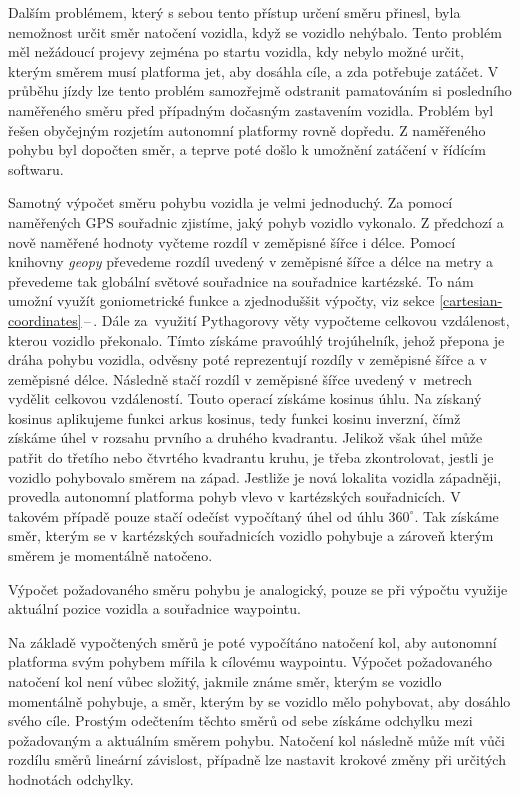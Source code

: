 \documentclass[czech, bachelor]{diploma}
\newcommand{\filipref}[1]{\ref{#1}\,--\,\nameref{#1}}
\begin{document}
Dalším problémem, který s sebou tento přístup určení směru přinesl, byla nemožnost určit směr natočení vozidla, když se vozidlo
nehýbalo. Tento problém měl nežádoucí projevy zejména po startu vozidla, kdy nebylo možné určit, kterým směrem musí platforma jet,
aby dosáhla cíle, a zda potřebuje zatáčet. V průběhu jízdy lze tento problém samozřejmě odstranit pamatováním si posledního
naměřeného směru před případným dočasným zastavením vozidla. Problém byl řešen obyčejným rozjetím autonomní platformy rovně
dopředu. Z naměřeného pohybu byl dopočten směr, a teprve poté došlo k umožnění zatáčení v řídícím softwaru.


Samotný výpočet směru pohybu vozidla je velmi jednoduchý. Za pomocí naměřených GPS souřadnic zjistíme, jaký pohyb vozidlo
vykonalo. Z předchozí a nově naměřené hodnoty vyčteme rozdíl v zeměpisné šířce i délce. Pomocí knihovny \emph{geopy} převedeme
rozdíl uvedený v zeměpisné šířce a délce na metry a převedeme tak globální světové souřadnice na souřadnice kartézské. To nám
umožní využít goniometrické funkce a zjednoduššit výpočty, viz sekce \filipref{cartesian-coordinates}. Dále za~využití Pythagorovy
věty vypočteme celkovou vzdálenost, kterou vozidlo překonalo. Tímto získáme pravoúhlý trojúhelník, jehož přepona je dráha
pohybu vozidla, odvěsny poté reprezentují rozdíly v zeměpisné šířce a v zeměpisné délce. Následně stačí rozdíl v zeměpisné šířce
uvedený v~metrech vydělit celkovou vzdáleností. Touto operací získáme kosinus úhlu. Na získaný kosinus aplikujeme funkci arkus
kosinus, tedy funkci kosinu inverzní, čímž získáme úhel v rozsahu prvního a druhého kvadrantu. Jelikož však úhel může patřit do
třetího nebo čtvrtého kvadrantu kruhu, je třeba zkontrolovat, jestli je vozidlo pohybovalo směrem na západ. Jestliže je nová
lokalita vozidla západněji, provedla autonomní platforma pohyb vlevo v kartézských souřadnicích. V takovém případě pouze stačí
odečíst vypočítaný úhel od úhlu $360^{\circ}$. Tak získáme směr, kterým se v kartézských souřadnicích vozidlo pohybuje a zároveň
kterým směrem je momentálně natočeno.

Výpočet požadovaného směru pohybu je analogický, pouze se při výpočtu využije aktuální pozice vozidla a souřadnice waypointu.

Na základě vypočtených směrů je poté vypočítáno natočení kol, aby autonomní platforma svým pohybem mířila k cílovému waypointu.
Výpočet požadovaného natočení kol není vůbec složitý, jakmile známe směr, kterým se vozidlo momentálně pohybuje, a směr, kterým
by se vozidlo mělo pohybovat, aby dosáhlo svého cíle. Prostým odečtením těchto směrů od sebe získáme odchylku mezi požadovaným
a aktuálním směrem pohybu. Natočení kol následně může mít vůči rozdílu směrů lineární závislost, případně lze nastavit krokové
změny při určitých hodnotách odchylky.
\end{document}
